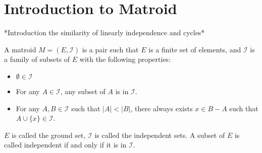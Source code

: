 \section{Introduction to Matroid}
*Introduction the similarity of linearly independence and cycles*


\begin{defn}
A matroid $M = (E, \mathcal{I})$ is a pair such that $E$ is a finite set of elements, and $\mathcal{I}$ is a family of subsets of $E$ with the following properties:
\begin{itemize}
\item $\emptyset \in \mathcal{I}$
\item For any $A\in \mathcal{I}$, any subset of $A$ is in $\mathcal{I}$.
\item For any $A, B \in \mathcal{I}$ such that $\lvert A \rvert < \lvert B \rvert$, there always exists $x \in B - A$ such that $A \cup \{ x \} \in \mathcal{I}$.
\end{itemize}
$E$ is called the ground set, $\mathcal{I}$ is called the independent sets. A subset of $E$ is called independent if and only if it is in $\mathcal{I}$.
\end{defn}

